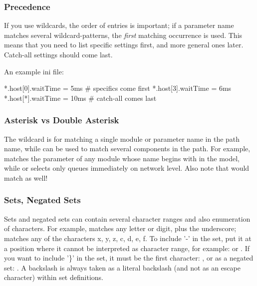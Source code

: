 \subsubsection{Precedence}

If you use wildcards, the order of entries is important; if a parameter
name matches several wildcard-patterns, the \textit{first} matching occurrence
is used. This means that you need to list specific settings first, and
more general ones later. Catch-all settings should come last.

An example ini file:

\begin{inifile}
[General]
*.host[0].waitTime = 5ms   # specifics come first
*.host[3].waitTime = 6ms
*.host[*].waitTime = 10ms  # catch-all comes last
\end{inifile}


\subsubsection{Asterisk vs Double Asterisk}

The \ttt{*} wildcard is for matching a single module or parameter name in the
path name, while \ttt{**} can be used to match several components in the path.
For example,  matches the  parameter of any module
whose name begins with  in the model, while 
or  selects only queues immediately on network level.
Also note that  would match 
as well!

\subsubsection{Sets, Negated Sets}

Sets and negated sets can contain several character ranges and also
enumeration of characters. For example,  matches any letter
or digit, plus the underscore;  matches any of the characters
x, y, z, c, d, e, f.
To include '-' in the set, put it at a position where it cannot be
interpreted as character range, for example:  or .
If you want to include '\}' in the set, it must be the first
character: , or as a negated set: .
A backslash is always taken as a literal backslash (and not as an escape character)
within set definitions.


